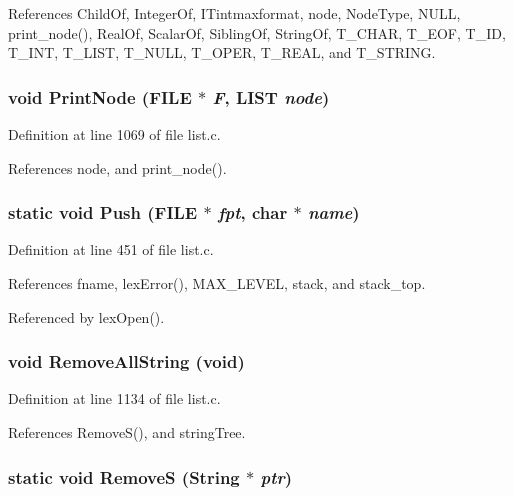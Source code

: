 References Child\-Of, Integer\-Of, ITintmaxformat, node, Node\-Type, NULL, print\_\-node(), Real\-Of, Scalar\-Of, Sibling\-Of, String\-Of, T\_\-CHAR, T\_\-EOF, T\_\-ID, T\_\-INT, T\_\-LIST, T\_\-NULL, T\_\-OPER, T\_\-REAL, and T\_\-STRING.
\subsubsection{\setlength{\rightskip}{0pt plus 5cm}void Print\-Node (FILE $\ast$ {\em F}, \bf{LIST} {\em node})}\label{list_8c_506b579eb7fea8a1580d4ce37aa1386c}




Definition at line 1069 of file list.c.

References node, and print\_\-node().
\subsubsection{\setlength{\rightskip}{0pt plus 5cm}static void Push (FILE $\ast$ {\em fpt}, char $\ast$ {\em name})\hspace{0.3cm}{\tt  [static]}}\label{list_8c_a596c5439ad97688494a64ac06612745}




Definition at line 451 of file list.c.

References fname, lex\-Error(), MAX\_\-LEVEL, stack, and stack\_\-top.

Referenced by lex\-Open().
\subsubsection{\setlength{\rightskip}{0pt plus 5cm}void Remove\-All\-String (void)}\label{list_8c_dd4ce9fcdce5715e5a9702624d8c9bf6}




Definition at line 1134 of file list.c.

References Remove\-S(), and string\-Tree.
\subsubsection{\setlength{\rightskip}{0pt plus 5cm}static void Remove\-S (\bf{String} $\ast$ {\em ptr})\hspace{0.3cm}{\tt  [static]}}\label{list_8c_144c1be59bb040db9394b54f9e5f4222}





